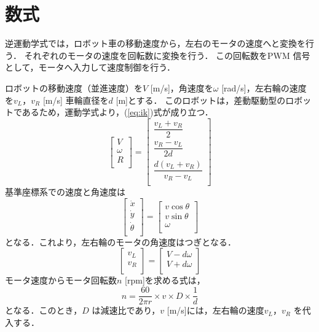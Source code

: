 \chapter{数式}\label{chap:chapter4}
逆運動学式では，ロボット車の移動速度から，左右のモータの速度へと変換を行う．
それぞれのモータの速度を回転数に変換を行う．
この回転数をPWM 信号として，モータへ入力して速度制御を行う．

ロボットの移動速度（並進速度）を$V$ [m/s]，角速度を$\omega$ [rad/s]，左右輪の速度を$v_L$，$v_R$ [m/s] 車輪直径を$d$ [m]とする．
このロボットは，差動駆動型のロボットであるため，運動学式より，(\ref{eq:ik})式が成り立つ．
\begin{equation}
    \label{eq:ik}
    \begin{bmatrix}
        V \\
        \omega \\
        R \\
    \end{bmatrix}
    =
    \begin{bmatrix}
        \dfrac{v_L + v_R}{2} \\
        \dfrac{v_R - v_L}{2 d} \\
        \dfrac{d(v_L + v_R)}{v_R - v_L} \\
    \end{bmatrix}
\end{equation}
基準座標系での速度と角速度は
\begin{equation}
    \label{eq:ik_base}
    \begin{bmatrix}
        \dot{x} \\
        \dot{y} \\
        \dot{\theta} \\
    \end{bmatrix}
    =
    \begin{bmatrix}
        v \cos{\theta} \\
        v \sin{\theta} \\
        \omega \\
    \end{bmatrix}
\end{equation}
となる．これより，左右輪のモータの角速度はつぎとなる．
\begin{equation}
    \label{eq:wheel_speed}
    \begin{bmatrix}
        v_L \\
        v_R \\
    \end{bmatrix}
    =
    \begin{bmatrix}
        V - d \omega \\
        V + d \omega \\
    \end{bmatrix}
\end{equation}
モータ速度からモータ回転数$n$ [rpm]を求める式は，
\begin{equation}
    \label{eq:v_rpm}
    n = \dfrac{60}{2 \pi r} \times v \times D \times \dfrac{1}{d}
\end{equation}
となる．このとき，$D$ は減速比であり，$v$ [m/s]には，左右輪の速度$v_L$，$v_R$ を代入する．
